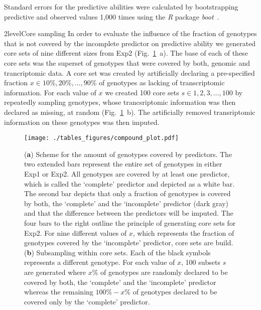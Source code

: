 \documentclass[12pt,titlepage]{article}
\begin{document}
Standard errors for the predictive abilities were calculated by bootstrapping
predictive and observed values 1,000 times using the \emph{R} package 
\emph{boot}~\cite{Canty2017}.



\Genetics2level{Core sampling}
In order to evaluate the influence of the fraction of genotypes that is not
covered by the incomplete predictor on predictive ability we generated core
sets of nine different sizes from Exp2 (Fig.~\ref{fig:compound-plot}~a).
The base of each of these core sets was the superset of genotypes that were
covered by both, genomic and trancriptomic data.
A core set was created by artificially declaring a pre-specified fraction 
$x \in {10\%, 20\%, \dots, 90\%}$ of genotypes as lacking of transcriptomic 
information.
For each value of $x$ we created 100 core sets $s \in {1, 2, 3, \dots, 100}$ by
repeatedly sampling genotypes, whose trancsriptomic information was then 
declared as missing, at random (Fig.~\ref{fig:compound-plot}~b).
The artificially removed transriptomic information on these genotypes was then
imputed.

\begin{figure}[H]
  \centering
  \texttt{[image: ./tables\_figures/compound\_plot.pdf]}
  \caption{
  (\textbf{a}) Scheme for the amount of genotypes covered by predictors.
  The two extended bars represent the entire set of genotypes in either Exp1 or
  Exp2.
  All genotypes are covered by at least one predictor, which is called the
  `complete' predictor and depicted as a white bar.
  The second bar depicts that only a fraction of genotypes is covered by both,
  the `complete' and the `incomplete' predictor (dark gray) and that the
  difference between the predictors will be imputed.
  The four bars to the right outline the principle of generating core sets for
  Exp2.
  For nine different values of $x$, which represents the fraction of genotypes
  covered by the `incomplete' predictor, core sets are build.
  (\textbf{b}) Subsampling within core sets.
  Each of the black symbols represents a different genotype.
  For each value of $x$, 100 subsets $s$ are generated where $x\%$ of genotypes
  are randomly declared to be covered by both, the `complete' and the
  `incomplete' predictor whereas the remaining $100\% - x\%$ of genotypes
  declared to be covered only by the `complete' predictor.
  }
\label{fig:compound-plot}
\end{figure}
\end{document}
